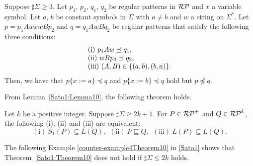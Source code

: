\begin{lem}\label{Sato1:Lemma13}
    Suppose $\sharp\Sigma \geq 3$.
    Let $p_{1}$, $p_{2}$, $q_{1}$, $q_{2}$ be regular patterns in $\mathcal{RP}$ and $x$ a variable symbol.
    Let $a$, $b$ be constant symbols in $\Sigma$ with $a \neq b$ and $w$ a string on $\Sigma^{\ast}$.
    Let $p = p_{1}AwxwBp_{2}$ and $q = q_{1}AwBq_{2}$ be regular patterns that satisfy the following three conditions:
    \[
        \begin{tabular}{ll}
            $\mathrm{(i)}~p_{1}Aw \preceq q_{1}$,  \\ 
            $\mathrm{(ii)}~wBp_{2} \preceq q_{2}$, \\
            $\mathrm{(iii)}$ 
            $(A,B)\in \{(a,b),(b,a)\}$.
        \end{tabular}
    \]
    Then, we have that $p\{x:=a\} \preceq q$ and $p\{x:=b\} \preceq q$ hold 
    but $p \not\preceq q$.
\end{lem}

From Lemma~\ref{Sato1:Lemma10}, the following theorem holds.
\begin{thm}\label{Sato1:Theorem10}
    Let $k$ be a positive integer. Suppose $\sharp\Sigma \geq 2k+1$.
    For $P \in \mathcal{RP}^{+}$ and $Q \in \mathcal{RP}^{k}$, 
    the following (i), (ii) and (iii) are equivalent:
    \[
        (\mathrm{i})\ S_{1}(P) \subseteq L(Q),\ \
        (\mathrm{ii})\ P \sqsubseteq Q,\ \
        (\mathrm{iii})\ L(P) \subseteq L(Q).
    \]
\end{thm}

The following Example \ref{counter-example4Theorem10} in \ref{Sato1} shows  that Theorem~\ref{Sato1:Theorem10} does not hold 
if $\sharp\Sigma\leq 2k$ holds.

